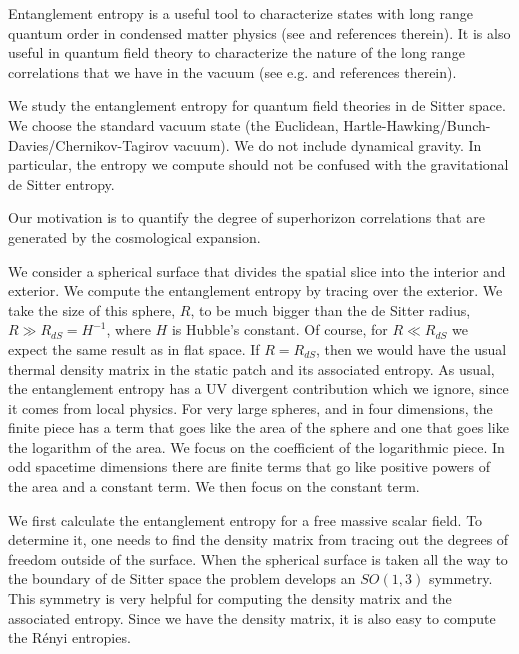 
 \Date{ }



Entanglement entropy is a useful tool to characterize states with long range quantum order in
condensed matter physics (see  and references therein). It is also useful in quantum field theory to characterize the nature
of the long range correlations that we have in the vacuum (see e.g.  and
references therein).

We   study the entanglement entropy for quantum field theories in de Sitter space. We  choose the standard
vacuum  state   (the Euclidean,  Hartle-Hawking/Bunch-Davies/Chernikov-Tagirov vacuum).
We do not include dynamical gravity. In particular, the entropy we compute should not be confused
with the gravitational de Sitter entropy.

Our motivation is to quantify the degree of superhorizon correlations that are generated by the
cosmological expansion.

We consider a spherical surface that divides the spatial slice into the interior and exterior. We
compute the entanglement entropy  by
tracing over the exterior.   We   take the size of this sphere, $R$, to be much bigger than the de Sitter radius, $R\gg R_{dS} = H^{-1}$,
 where $H$ is Hubble's constant. Of course, for  $R\ll R_{dS}$ we expect  the same result as in flat space.
If $R = R_{dS}$, then we would have the usual thermal density matrix in the static patch and its associated
entropy. 
As usual, the entanglement entropy has a UV divergent contribution which we   ignore,  since it comes
from local physics. For very large spheres, and in four dimensions,
the finite piece has a term that goes like the area of the sphere and one that goes like the logarithm
of the area. We focus on the coefficient of the logarithmic piece. In odd spacetime dimensions there
are finite terms that go like positive powers of the area and a constant term. We then focus on
the constant term.


We first calculate the entanglement
entropy  for a  free massive scalar field. To determine it, one needs to find the density matrix from tracing out the degrees of freedom outside of the surface.
 When the spherical surface is taken all the way to the boundary of de Sitter space the problem develops
 an  $SO(1,3)$ symmetry. This symmetry is very helpful for
computing  the density matrix and the associated entropy. Since we have the density matrix, it is also easy
to compute the R\'enyi entropies.

